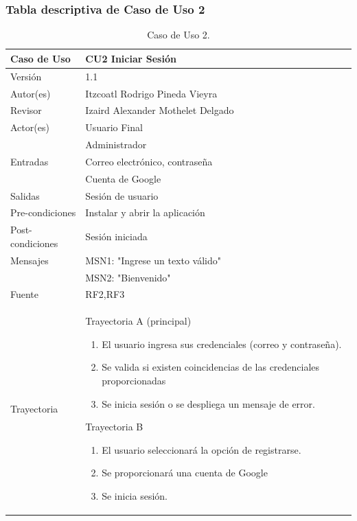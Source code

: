 \documentclass{article}
\begin{document}
\subsubsection{Tabla descriptiva de Caso de Uso 2}
\begin{table}[H]
\caption{Caso de Uso 2.}
\begin{tabular}{|M{4cm}|M{12cm}|}
\hline
Caso de Uso & CU2 Iniciar Sesión\\ \hline
Versión & 1.1\\ \hline
Autor(es) & Itzcoatl Rodrigo Pineda Vieyra\\ \hline
Revisor & Izaird Alexander Mothelet Delgado \\ \hline
Actor(es) & Usuario Final \\ & Administrador\\ \hline
Entradas &  Correo electrónico, contraseña\\ & Cuenta de Google \\ \hline
Salidas & Sesión de usuario \\ \hline
Pre-condiciones & Instalar y abrir la aplicación \\ \hline
Post-condiciones & Sesión iniciada\\ \hline
Mensajes & MSN1: "Ingrese un texto válido"\\
		   & MSN2: "Bienvenido"\\ \hline
Fuente & RF2,RF3 \\ \hline	
Trayectoria & 

Trayectoria A (principal)

\begin{enumerate}
\item El usuario ingresa sus credenciales (correo y contraseña).
\item Se valida si existen coincidencias de las credenciales proporcionadas
\item Se inicia sesión o se despliega un mensaje de error.
\end{enumerate}

Trayectoria B

\begin{enumerate}
\item El usuario seleccionará la opción de registrarse.
\item Se proporcionará una cuenta de Google
\item Se inicia sesión.
\end{enumerate}
\\ \hline
\end{tabular}
\end{table}
\end{document}
